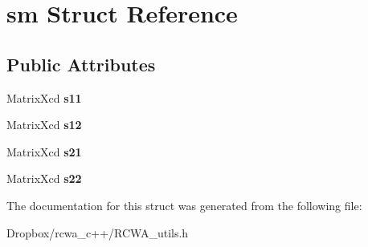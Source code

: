\hypertarget{structsm}{}\section{sm Struct Reference}
\label{structsm}
\subsection*{Public Attributes}
\begin{DoxyCompactItemize}
\item 
Matrix\+Xcd {\bfseries s11}\hypertarget{structsm_a435d1c7563e1ee2e386aabff7e70096a}{}\label{structsm_a435d1c7563e1ee2e386aabff7e70096a}

\item 
Matrix\+Xcd {\bfseries s12}\hypertarget{structsm_a9b6b627b7d907a4eabe3b9acc74d367b}{}\label{structsm_a9b6b627b7d907a4eabe3b9acc74d367b}

\item 
Matrix\+Xcd {\bfseries s21}\hypertarget{structsm_a387358cf369628ebdfb3e01b02dbf9b2}{}\label{structsm_a387358cf369628ebdfb3e01b02dbf9b2}

\item 
Matrix\+Xcd {\bfseries s22}\hypertarget{structsm_af9758c455bcdc8fc2a276c513fa88f99}{}\label{structsm_af9758c455bcdc8fc2a276c513fa88f99}

\end{DoxyCompactItemize}


The documentation for this struct was generated from the following file\+:\begin{DoxyCompactItemize}
\item 
Dropbox/rcwa\+\_\+c++/R\+C\+W\+A\+\_\+utils.\+h\end{DoxyCompactItemize}
